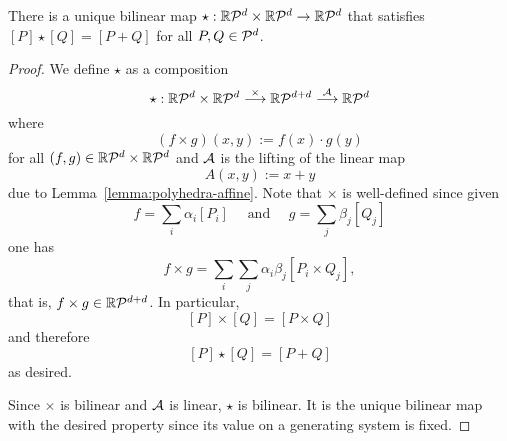 \begin{lemma}[Convolution]
  \label{lemma:polyhedra-convolution}
  There is a unique bilinear map $\star: \mathbb{R}\mathcal{P}^d \times \mathbb{R}\mathcal{P}^d \to \mathbb{R}\mathcal{P}^d$
  that satisfies $[P] \star [Q] = [P + Q]$ for all $P, Q \in \mathcal{P}^d$.
\end{lemma}
\begin{proof}
  We define $\star$ as a composition
  \[
    \star: \mathbb{R}\mathcal{P}^d \times \mathbb{R}\mathcal{P}^d \stackrel{\times}{\longrightarrow} \mathbb{R}\mathcal{P}^{d+d} \stackrel{\mathcal{A}}{\longrightarrow} \mathbb{R}\mathcal{P}^d
  \]
  where
  \[
    (f \times g)(x,y) := f(x) \cdot g(y)
  \]
  for all $(f,g) \in \mathbb{R}\mathcal{P}^d \times \mathbb{R}\mathcal{P}^d$
  and $\mathcal{A}$ is the lifting of the linear map
  \[
    A(x,y) := x + y
  \]
  due to Lemma~\ref{lemma:polyhedra-affine}.
  Note that $\times$ is well-defined since given
  \[
    f = \sum_i \alpha_i [P_i] \quad\text{ and }\quad g = \sum_j \beta_j [Q_j]
  \]
  one has
  \[
    f \times g = \sum_i \sum_j \alpha_i \beta_j [P_i \times Q_j],
  \]
  that is, $f\times g \in \mathbb{R}\mathcal{P}^{d+d}$.
  In particular,
  \[
    [P] \times [Q] = [P \times Q]
  \]
  and therefore
  \[
    [P] \star [Q] = [P + Q]
  \]
  as desired.

  Since $\times$ is bilinear and $\mathcal{A}$ is linear, $\star$ is bilinear.
  It is the unique bilinear map with the desired property
  since its value on a generating system is fixed.
\end{proof}

